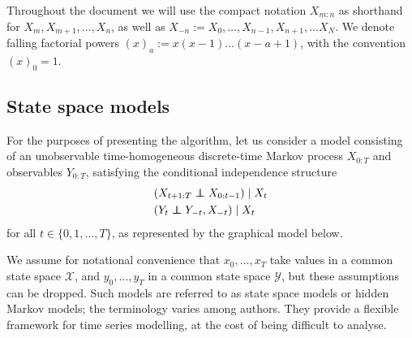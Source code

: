 \documentclass[fleqn]{article}
\theoremstyle{definition}
\newcommand\indep{\protect\mathpalette{\protect\independenT}{\perp}}
\def\independenT#1#2{\mathrel{\rlap{$#1#2$}\mkern2mu{#1#2}}}
\begin{document}
Throughout the document we will use the compact notation $X_{m:n}$ as shorthand for $X_m, X_{m+1}, \dots, X_n$, as well as $X_{-n} := X_0, \dots, X_{n-1}, X_{n+1}, \dots X_{N}$.
We denote falling factorial powers $(x)_a := x(x-1)\dots(x-a+1)$, with the convention $(x)_0 = 1$.


\subsection{State space models}\label{sec:SSM_spec}
For the purposes of presenting the algorithm, let us consider a model consisting of an unobservable time-homogeneous discrete-time Markov process $X_{0:T}$ and observables $Y_{0:T}$, satisfying the conditional independence structure
\begin{align*}
& (X_{t+1:T} \indep X_{0:t-1}) \mid X_t \\
& (Y_t \indep Y_{-t}, X_{-t}) \mid X_t
\end{align*}
for all $t \in \{0,1,\dots, T\}$, as represented by the graphical model below.

\begin{center}
\end{center}

We assume for notational convenience that $x_0,\dots,x_T$ take values in a common state space $\mathcal{X}$, and $y_0,\dots,y_T$ in a common state space $\mathcal{Y}$, but these assumptions can be dropped. 
Such models are referred to as {state space models} or {hidden Markov models}; the terminology varies among authors. They provide a flexible framework for time series modelling, at the cost of being difficult to analyse.
\end{document}
